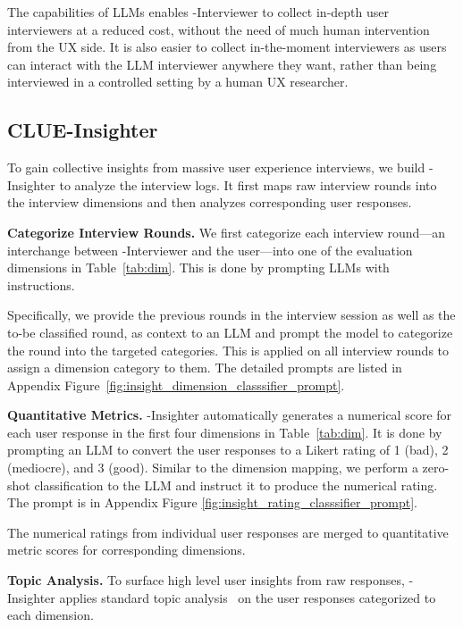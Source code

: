 The capabilities of LLMs enables \method-Interviewer to collect in-depth user interviewers at a reduced cost, without the need of much human intervention from the UX side. It is also easier to collect in-the-moment interviewers as users can interact with the LLM interviewer anywhere they want, rather than being interviewed in a controlled setting by a human UX researcher.



\subsection{CLUE-Insighter}
\label{sec.insigher}

To gain collective insights from massive user experience interviews, we build \method-Insighter to analyze the interview logs. It first maps raw interview rounds into the interview dimensions 
and then analyzes corresponding user responses.

\textbf{Categorize Interview Rounds.} We first categorize each interview round---an interchange between \method-Interviewer and the user---into one of the evaluation dimensions in Table~\ref{tab:dim}. This is done by prompting LLMs with instructions.

Specifically, we provide the previous rounds in the interview session as well as the to-be classified round, as context to an LLM and prompt the model to categorize the round into the targeted categories. This is applied on all interview rounds to assign a dimension category to them. The detailed prompts are listed in Appendix Figure~\ref{fig:insight_dimension_classsifier_prompt}.

\textbf{Quantitative Metrics.} \method-Insighter  automatically generates a numerical score for each user response in the first four dimensions in Table~\ref{tab:dim}.
It is done by prompting an LLM to convert the user responses to a Likert rating of 1 (bad), 2 (mediocre), and 3 (good). 
Similar to the dimension mapping, we perform a zero-shot classification to the LLM and instruct it to produce the numerical rating. The prompt is in Appendix Figure \ref{fig:insight_rating_classsifier_prompt}.

The numerical ratings from individual user responses are merged to quantitative metric scores for corresponding dimensions.

\textbf{Topic Analysis.}  To surface high level user insights from raw responses, \method-Insighter applies standard topic analysis~\cite{grootendorst2022bertopic} on the user responses categorized to each dimension.

